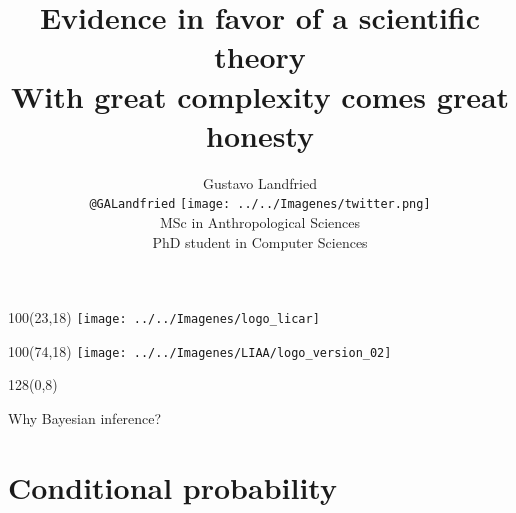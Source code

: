 \documentclass[shownotes]{beamer}
\title[Bayesian inference]{Evidence in favor of a scientific theory\\ \large With great complexity comes great honesty}
\author[Gustavo Landfried]{Gustavo Landfried \\ \scriptsize \texttt{@GALandfried} \texttt{[image: ../../Imagenes/twitter.png]} \\ \vspace{0.2cm} 
MSc in Anthropological Sciences \\
PhD student in Computer Sciences 
\vspace{-0.3cm}}
\institute[DC-ICC-CONICET]{\texttt{[image: ../../Imagenes/dc-logo]}}
\date{}
\begin{document}
\begin{frame}[noframenumbering]
 
 \begin{textblock}{100}(23,18)
 \texttt{[image: ../../Imagenes/logo\_licar]} 
 \end{textblock}
  \begin{textblock}{100}(74,18)
 \texttt{[image: ../../Imagenes/LIAA/logo\_version\_02]} 
 \end{textblock}

\vspace{2.5cm}
\maketitle
 
\end{frame}

\footnotesize


\begin{frame}
\begin{textblock}{128}(0,8)
\begin{center}
 \Large Why Bayesian inference?
\end{center}
\end{textblock}
\vspace{0.75cm}
 
 
\end{frame}

\section{Conditional probability}
\end{document}
